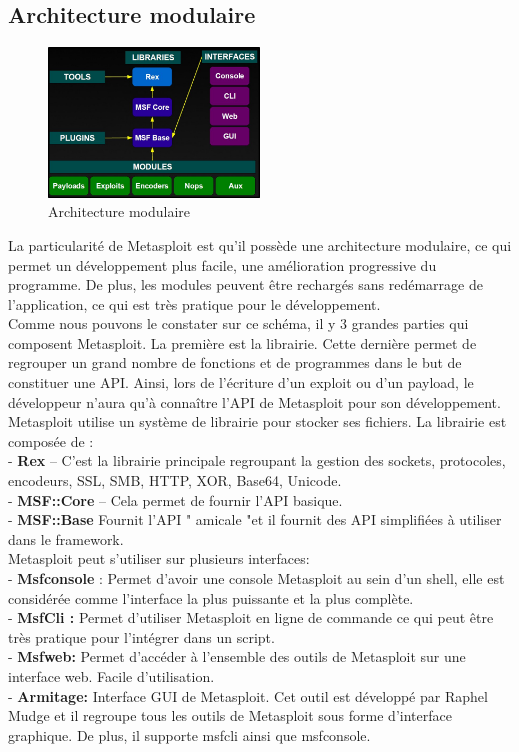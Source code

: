 \subsection{Architecture modulaire}
\begin{figure}[htp!]
  \centering
  \setlength\figureheight{7cm}
  \setlength\figurewidth{9cm}
  \includegraphics[width=0.5\textwidth]{oui/Ancien/imangeancien/Metasploit_Architecture.jpg}
  \caption{Architecture modulaire}
  \label{fig:courbe-tikz}
\end{figure}

La particularité de Metasploit est qu’il possède une architecture modulaire, ce qui permet un développement plus facile, une amélioration progressive du programme. De plus, les modules peuvent être rechargés sans redémarrage de l’application, ce qui est très pratique pour le développement.\\
Comme nous pouvons le constater sur ce schéma, il y 3 grandes parties qui composent Metasploit. La première est la librairie. Cette dernière permet de regrouper un grand nombre de fonctions et de programmes dans le but de constituer une API. Ainsi, lors de l’écriture d’un exploit ou d’un payload, le développeur n’aura qu'à connaître l’API de Metasploit pour son développement.\\
 Metasploit utilise un système de librairie pour stocker ses fichiers.
 La librairie est composée de :\\
- \textbf{Rex} – C’est la librairie principale regroupant la gestion des sockets, protocoles, encodeurs, SSL, SMB, HTTP, XOR, Base64, Unicode.\\
- \textbf{MSF::Core} – Cela permet de fournir l’API basique.\\
- \textbf{MSF::Base} Fournit l'API " amicale "et il fournit des API simplifiées à utiliser dans le framework.\\

 Metasploit peut s’utiliser sur plusieurs interfaces:\\
- \textbf{Msfconsole} : Permet d’avoir une console Metasploit au sein d’un shell, elle est considérée comme l’interface la plus puissante et la plus complète.\\
- \textbf{MsfCli :} Permet d’utiliser Metasploit en ligne de commande ce qui peut être très pratique pour l’intégrer dans un script.\\
- \textbf{Msfweb:} Permet d’accéder à l’ensemble des outils de Metasploit sur une interface web. Facile d’utilisation.\\
- \textbf{Armitage:} Interface GUI de Metasploit. Cet outil est développé par Raphel Mudge et il regroupe tous les outils de Metasploit sous forme d’interface graphique. De plus, il supporte msfcli ainsi que msfconsole.\\

